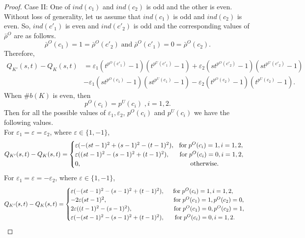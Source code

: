 \documentclass[10pt,a4paper,reqno]{amsart}
\theoremstyle{definition}
\theoremstyle{remark}
\begin{document}
\begin{proof}
		\noindent
		Case II:  One of $ind(c_{1})$ and $ind(c_{2})$ is odd and the other is even. Without loss of generality, let us assume that $ind(c_{1})$ is odd and $ind(c_{2})$ is even.
		So, $ind(c'_{1})$ is even and $ind(c'_{2})$ is odd and the corresponding values of $\bar{\rho}^{O}$ are as follows.
		\[\bar{\rho}^{O}(c_{1})=1=\bar{\rho}^{O}(c'_{2}) \; \text{and} \; \bar{\rho}^{O}(c'_{1})=0=\bar{\rho}^{O}(c_{2}). \]
		Therefore, \begin{align*}
			Q_{K'}(s,t)-Q_{K}(s,t) &=\varepsilon_{1}(t^{p^{O}(c'_{1})}-1)(t^{p^{U}(c'_{1})}-1)+\varepsilon_{2}(st^{p^{O}(c'_{2})}-1)(st^{p^{U}(c'_{2})}-1)\\ &-\varepsilon_{1}(st^{p^{O}(c_{1})}-1)(st^{p^{U}(c_{1})}-1)-\varepsilon_{2}(t^{p^{O}(c_{2})}-1)(t^{p^{U}(c_{2})}-1).
		\end{align*}
		When  $\# b(K)$ is even, then
		\[p^{O}(c_i)=p^{U}(c_i)\; , i=1,2.\]
		Then for all the possible values of $\varepsilon_{1}, \varepsilon_{2}$, $p^{O}(c_i)$ and  $p^{U}(c_i)$ we have the following values.\\
		For $\varepsilon_{1}=\varepsilon=\varepsilon_{2}$, where $\varepsilon \in \{1,-1\}$,
		$$Q_{K'}(s,t)-Q_{K}(s,t)
		=\begin{cases}
			\varepsilon (-(st-1)^{2}+(s-1)^{2}-(t-1)^{2}),\hspace{0.15cm} \; \text{for} \; p^{O}(c_i)=1, i=1,2,\\
			\varepsilon ((st-1)^{2}-(s-1)^{2}+(t-1)^{2}), \; \quad\; \text{for} \; p^{O}(c_i)=0, i=1,2,\\
			0, \hspace{5.95cm} \text{otherwise.}
		\end{cases}
		$$
		For $\varepsilon_{1}=\varepsilon=-\varepsilon_{2}$, where $\varepsilon \in \{1,-1\}$,
		$$Q_{K'}(s,t)-Q_{K}(s,t)
		=\begin{cases}
			\varepsilon (-(st-1)^{2}-(s-1)^{2}+
			(t-1)^{2}),  \hspace{0.5cm} \text{for} \; p^{O}(c_i)=1,  i=1,2,\\
			-2\varepsilon(st-1)^{2},  \hspace{3.85cm}\text{for} \; p^{O}(c_1)=1, p^{O}(c_2)=0,\\
			2\varepsilon((t-1)^{2}-(s-1)^{2}),  \hspace{2.4cm} \text{for} \; p^{O}(c_1)=0, p^{O}(c_2)=1,\\
			\varepsilon (-(st-1)^{2}-(s-1)^{2}+(t-1)^{2}), \hspace{0.6cm} \text{for} \; p^{O}(c_i)=0, i=1,2.
		\end{cases}
		$$
		

\end{proof}
\end{document}
